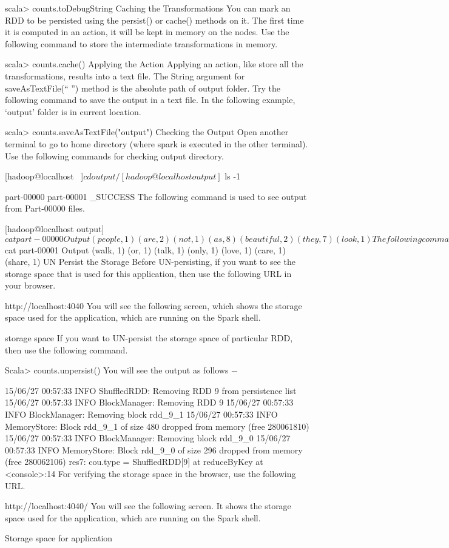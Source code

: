 scala> counts.toDebugString
Caching the Transformations
You can mark an RDD to be persisted using the persist() or cache() methods on it. The first time it is computed in an action, it will be kept in memory on the nodes. Use the following command to store the intermediate transformations in memory.

scala> counts.cache()
Applying the Action
Applying an action, like store all the transformations, results into a text file. The String argument for saveAsTextFile(“ ”) method is the absolute path of output folder. Try the following command to save the output in a text file. In the following example, ‘output’ folder is in current location.

scala> counts.saveAsTextFile("output")
Checking the Output
Open another terminal to go to home directory (where spark is executed in the other terminal). Use the following commands for checking output directory.

[hadoop@localhost ~]$ cd output/ 
[hadoop@localhost output]$ ls -1 
 
part-00000 
part-00001 
_SUCCESS
The following command is used to see output from Part-00000 files.

[hadoop@localhost output]$ cat part-00000
Output
(people,1) 
(are,2) 
(not,1) 
(as,8) 
(beautiful,2) 
(they, 7) 
(look,1) 
The following command is used to see output from Part-00001 files.

[hadoop@localhost output]$ cat part-00001 
Output
(walk, 1) 
(or, 1) 
(talk, 1) 
(only, 1) 
(love, 1) 
(care, 1) 
(share, 1) 
UN Persist the Storage
Before UN-persisting, if you want to see the storage space that is used for this application, then use the following URL in your browser.

http://localhost:4040
You will see the following screen, which shows the storage space used for the application, which are running on the Spark shell.

storage space
If you want to UN-persist the storage space of particular RDD, then use the following command.

Scala> counts.unpersist()
You will see the output as follows −

15/06/27 00:57:33 INFO ShuffledRDD: Removing RDD 9 from persistence list 
15/06/27 00:57:33 INFO BlockManager: Removing RDD 9 
15/06/27 00:57:33 INFO BlockManager: Removing block rdd_9_1 
15/06/27 00:57:33 INFO MemoryStore: Block rdd_9_1 of size 480 dropped from memory (free 280061810) 
15/06/27 00:57:33 INFO BlockManager: Removing block rdd_9_0 
15/06/27 00:57:33 INFO MemoryStore: Block rdd_9_0 of size 296 dropped from memory (free 280062106) 
res7: cou.type = ShuffledRDD[9] at reduceByKey at <console>:14
For verifying the storage space in the browser, use the following URL.

http://localhost:4040/
You will see the following screen. It shows the storage space used for the application, which are running on the Spark shell.

Storage space for application
